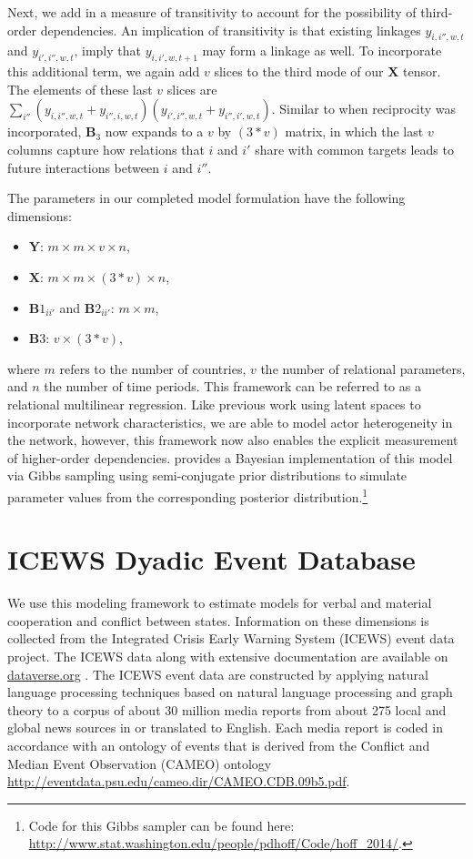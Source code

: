 \documentclass[3p,times,twocolumn,authoryear,12pt]{elsarticle}
\newcommand{\bl}[1]{{\mathbf #1}}
\begin{document}
Next, we add in a measure of transitivity to account for the possibility of third-order dependencies. An implication of transitivity is that existing linkages $y_{i,i'',w,t}$ and $y_{i',i'',w,t}$, imply that $y_{i,i',w,t+1}$ may form a linkage as well. To incorporate this additional term, we again add $v$ slices to the third mode of our $\bl X$ tensor. The elements of these last $v$ slices are  $\sum_{i''} ( y_{i,i'',w,t} + y_{i'',i,w,t}) ( y_{i',i'',w,t} + y_{i'',i',w,t})$. Similar to when reciprocity was incorporated, $\bl B_3$ now expands to a $v$ by $(3*v)$ matrix, in which the last $v$ columns capture how relations that $i$ and $i'$ share with common targets leads to future interactions between $i$ and $i''$.

The parameters in our completed model formulation have the following dimensions: 

\begin{itemize}
	\item $\bl Y$: $m \times m \times v \times n$, 
	\item $\bl X$: $m \times m \times (3*v) \times n$, 	
	\item $\bl B1_{ii'}$ and $\bl B2_{ii'}$: $m \times m$, 	
	\item $\bl B3$: $v \times (3*v)$,
\end{itemize}

\noindent where $m$ refers to the number of countries, $v$ the number of relational parameters, and $n$ the number of time periods. This framework can be referred to as a relational multilinear regression. Like previous work using latent spaces to incorporate network characteristics, we are able to model actor heterogeneity in the network, however, this framework now also enables the explicit measurement of higher-order dependencies. \citet{hoff:2014} provides a Bayesian implementation of this model via Gibbs sampling using semi-conjugate prior distributions to simulate parameter values from the corresponding posterior distribution.\footnote{Code for this Gibbs sampler can be found here: \url{http://www.stat.washington.edu/people/pdhoff/Code/hoff_2014/}.}

\section{ICEWS Dyadic Event Database}

We use this modeling framework to estimate models for verbal and material cooperation and conflict between states. Information on these dimensions is collected from the Integrated Crisis Early Warning System (ICEWS) event data project. The ICEWS data along with extensive documentation are available on \url{dataverse.org} \citep{icews:2015:aggregations,icews:2015:data}. The ICEWS event data are constructed by applying natural language processing techniques based on natural language processing and graph theory \citep{boschee:natarajan:etal:2013} to a corpus of about 30 million media reports from about 275 local and global news sources in or translated to English.  Each media report is coded in accordance with an ontology of events that is derived from the Conflict and Median Event Observation (CAMEO) ontology  \url{http://eventdata.psu.edu/cameo.dir/CAMEO.CDB.09b5.pdf}. 
\end{document}
